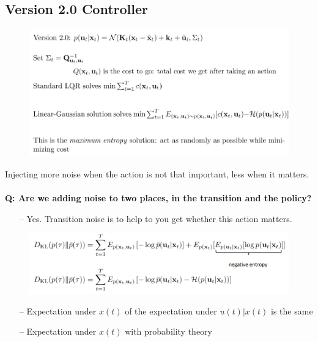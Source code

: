 \documentclass{article}
\begin{document}
\subsection{Version 2.0 Controller}
\begin{figure}[htp]
    \centering
        \includegraphics[width=0.8\linewidth]{img/v2control.png}
    \label{fig:v2control}
\end{figure}
Injecting more noise when the action is not that important, less when it matters.\\\\
\textbf{Q: Are we adding noise to two places, in the transition and the policy?}
\begin{itemize}
\item[--] Yes. Transition noise is to help to you get whether this action matters.
\end{itemize}
\begin{figure}[htp]
    \centering
        \includegraphics[width=0.8\linewidth]{img/dkl.png}
    \label{fig:dkl}
\end{figure}
\begin{itemize}
\item[--] Expectation under $x(t)$ of the expectation under $u(t)|x(t)$ is the same
\item[--]Expectation under $x(t)$ with probability theory
\end{itemize}
\end{document}
